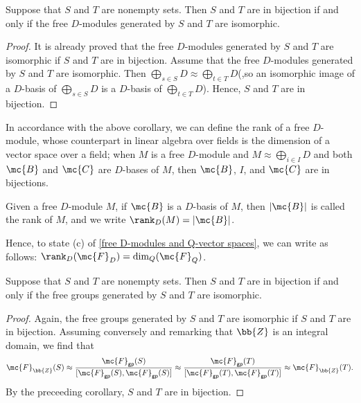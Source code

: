 \begin{cor}
    Suppose that $S$ and $T$ are nonempty sets.
    Then $S$ and $T$ are in bijection if and only if the free $D$-modules generated by $S$ and $T$ are isomorphic.
\end{cor}
\begin{proof}
    It is already proved that the free $D$-modules generated by $S$ and $T$ are isomorphic if $S$ and $T$ are in bijection.
    Assume that the free $D$-modules generated by $S$ and $T$ are isomorphic.
    Then $\bigoplus_{s\in S} D\approx \bigoplus_{t\in T} D$(,so an isomorphic image of a $D$-basis of $\bigoplus_{s\in S} D$ is a $D$-basis of $\bigoplus_{t\in T} D$).
    Hence, $S$ and $T$ are in bijection.
\end{proof}
\begin{rmk}
    In accordance with the above corollary, we can define the rank of a free $D$-module, whose counterpart in linear algebra over fields is the dimension of a vector space over a field; when $M$ is a free $D$-module and $M\approx\bigoplus_{i\in I} D$ and both $\mc{B}$ and $\mc{C}$ are $D$-bases of $M$, then $\mc{B}$, $I$, and $\mc{C}$ are in bijections.
    \begin{defi}
        Given a free $D$-module $M$, if $\mc{B}$ is a $D$-basis of $M$, then $|\mc{B}|$ is called the rank of $M$, and we write $\rank_D(M)=|\mc{B}|$.
    \end{defi}
    Hence, to state (c) of \cref{free D-modules and Q-vector spaces}, we can write as follows: $\rank_D(\mc{F}_D)=\dim_Q(\mc{F}_Q)$.
\end{rmk}
\begin{cor}
    Suppose that $S$ and $T$ are nonempty sets.
    Then $S$ and $T$ are in bijection if and only if the free groups generated by $S$ and $T$ are isomorphic.
\end{cor}
\begin{proof}
    Again, the free groups generated by $S$ and $T$ are isomorphic if $S$ and $T$ are in bijection.
    Assuming conversely and remarking that $\bb{Z}$ is an integral domain, we find that
    \begin{align*}
        \mc{F}_\bb{Z}(S)\approx\frac{\mc{F}_\textsf{gp}(S)}{[\mc{F}_\textsf{gp}(S), \mc{F}_\textsf{gp}(S)]}\approx\frac{\mc{F}_\textsf{gp}(T)}{[\mc{F}_\textsf{gp}(T), \mc{F}_\textsf{gp}(T)]}\approx\mc{F}_\bb{Z}(T).
    \end{align*}
    By the preceeding corollary, $S$ and $T$ are in bijection.
\end{proof}